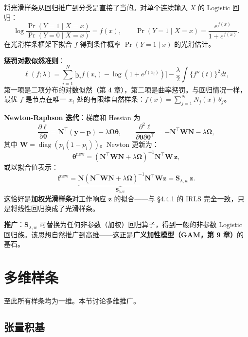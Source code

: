 将光滑样条从回归推广到分类是直接了当的。对单个连续输入 $X$ 的 Logistic 回归：
\[
\log\frac{\Pr(Y=1\mid X=x)}{\Pr(Y=0\mid X=x)} = f(x), \qquad
\Pr(Y=1\mid X=x) = \frac{e^{f(x)}}{1 + e^{f(x)}}.
\]
在光滑样条框架下拟合 $f$ 得到条件概率 $\Pr(Y=1\mid x)$ 的光滑估计。

\textbf{惩罚对数似然准则}：
\begin{equation}\label{eq:penalized_loglik}
    \ell(f; \lambda) = \sum_{i=1}^{N} \big[ y_i f(x_i) - \log(1 + e^{f(x_i)}) \big]
    - \frac{\lambda}{2} \int \big\{ f''(t) \big\}^2 dt,
\end{equation}
第一项是二项分布的对数似然（第 4 章），第二项是曲率惩罚。与回归情况一样，最优 $f$ 是节点在唯一 $x_i$ 处的有限维自然样条：$f(x) = \sum_{j=1}^{N} N_j(x)\,\theta_j$。

\textbf{Newton-Raphson 迭代}：梯度和 Hessian 为
\[
\frac{\partial\ell}{\partial\boldsymbol{\theta}} = \mathbf{N}^\top(\mathbf{y} - \mathbf{p}) - \lambda\boldsymbol{\Omega}\boldsymbol{\theta}, \qquad
\frac{\partial^2\ell}{\partial\boldsymbol{\theta}\partial\boldsymbol{\theta}^\top} = -\mathbf{N}^\top\mathbf{W}\mathbf{N} - \lambda\boldsymbol{\Omega},
\]
其中 $\mathbf{W} = \operatorname{diag}(p_i(1-p_i))$。Newton 更新为：
\begin{equation}\label{eq:nplr_update_theta}
    \boldsymbol{\theta}^{\mathrm{new}} = (\mathbf{N}^\top\mathbf{W}\mathbf{N} + \lambda\boldsymbol{\Omega})^{-1}
    \mathbf{N}^\top\mathbf{W}\,\mathbf{z},
\end{equation}
或以拟合值表示：
\[
\mathbf{f}^{\mathrm{new}} = \underbrace{\mathbf{N}(\mathbf{N}^\top\mathbf{W}\mathbf{N} + \lambda\boldsymbol{\Omega})^{-1}\mathbf{N}^\top\mathbf{W}}_{\mathbf{S}_{\lambda,w}} \mathbf{z}
    = \mathbf{S}_{\lambda,w}\,\mathbf{z}.
\]
这恰好是\textbf{加权光滑样条}对工作响应 $\mathbf{z}$ 的拟合——与 §4.4.1 的 IRLS 完全一致，只是将线性回归换成了光滑样条。

\textbf{推广}：$\mathbf{S}_{\lambda,w}$ 可替换为任何非参数（加权）回归算子，得到一般的非参数 Logistic 回归族。该思想自然推广到高维——这正是\textbf{广义加性模型（GAM，第 9 章）}的基石。


\section{多维样条}

至此所有样条均为一维。本节讨论多维推广。

\subsection{张量积基}

